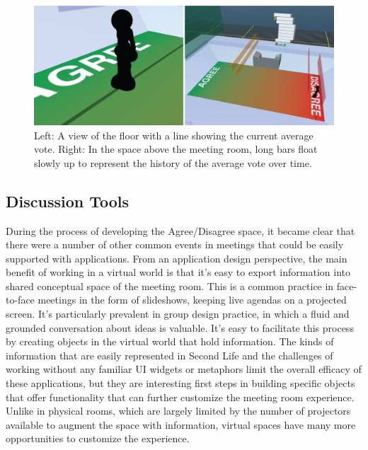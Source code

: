 \begin{figure}[t]
	\includegraphics{figures/average+history.png}
	\caption{Left: A view of the floor with a line showing the current average vote. Right: In the space above the meeting room, long bars float slowly up to represent the history of the average vote over time.}
	\label{fig:information_space_average_history}
\end{figure}

\subsection{Discussion Tools}

During the process of developing the Agree/Disagree space, it became clear that there were a number of other common events in meetings that could be easily supported with applications. From an application design perspective, the main benefit of working in a virtual world is that it's easy to export information into shared conceptual space of the meeting room. This is a common practice in face-to-face meetings in the form of slideshows, keeping live agendas on a projected screen. It's particularly prevalent in group design practice, in which a fluid and grounded conversation about ideas is valuable. \citep{Dwyer:2005uj} It's easy to facilitate this process by creating objects in the virtual world that hold information. The kinds of information that are easily represented in Second Life and the challenges of working without any familiar UI widgets or metaphors limit the overall efficacy of these applications, but they are interesting first steps in building specific objects that offer functionality that can further customize the meeting room experience. Unlike in physical rooms, which are largely limited by the number of projectors available to augment the space with information, virtual spaces have many more opportunities to customize the experience.

